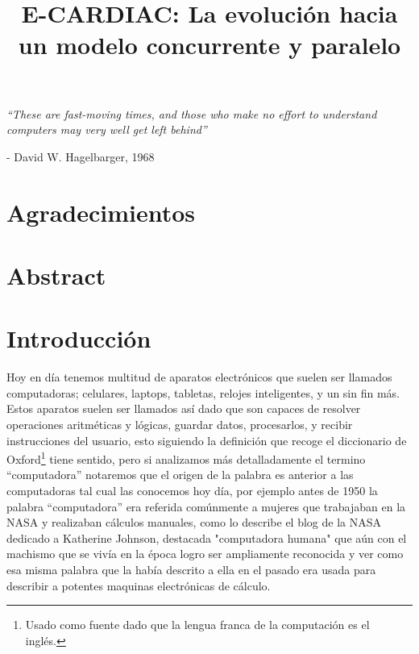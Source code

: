 \documentclass[letterpaper,12pt,oneside]{book}
\title{E-CARDIAC: La evolución hacia un modelo concurrente y paralelo}
\begin{document}
	\frontmatter
	\pagestyle{plain} %

    

\chapter*{}
\begin{flushright}%
  \emph{``These are fast-moving times, and those who make no effort to understand computers may very well get left behind''}
  
  
  - David W. Hagelbarger, 1968
\end{flushright}

\chapter*{Agradecimientos}

\chapter*{Abstract}

\chapter{Introducción}

	Hoy en día tenemos multitud de aparatos electrónicos que suelen ser llamados computadoras; celulares, laptops, tabletas, relojes inteligentes, y un sin fin más. 
	Estos aparatos suelen ser llamados así dado que son capaces de resolver operaciones aritméticas y lógicas, guardar datos, procesarlos, y recibir instrucciones del 
	usuario, esto siguiendo la definición
	que recoge el diccionario de Oxford\footnote{Usado como fuente dado que la lengua franca de la computación es el inglés.} tiene sentido,
	pero si analizamos más detalladamente el termino ``computadora''  notaremos que el origen de la palabra es anterior a las computadoras
	tal cual las conocemos hoy día, por ejemplo antes de 1950 la palabra ``computadora''  era referida comúnmente a mujeres
	que trabajaban en la NASA y realizaban cálculos manuales, como lo describe el blog \cite{nasa_who_2020} de la NASA dedicado a Katherine Johnson, destacada "computadora humana" que aún con el machismo que se vivía en la época logro ser ampliamente reconocida y ver como esa misma palabra que la había descrito a ella en el pasado
	era usada para describir a potentes maquinas electrónicas de cálculo.
\end{document}
